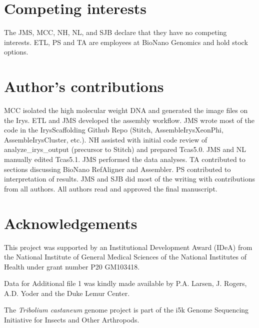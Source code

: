 \documentclass{bmcart}
\begin{document}
\begin{backmatter}

\section*{Competing interests}
  The JMS, MCC, NH, NL, and SJB declare that they have no competing interests. ETL, PS and TA are employees at BioNano Genomics and hold stock options. 


\section*{Author's contributions}
MCC isolated the high molecular weight DNA and generated the image files on the Irys. ETL and JMS developed the assembly workflow. JMS wrote most of the code in the IrysScaffolding Github Repo (Stitch, AssembleIrysXeonPhi, AssembleIrysCluster, etc.). NH assisted with initial code review of analyze\_irys\_output (precursor to Stitch) and prepared Tcas5.0. JMS and NL manually edited Tcas5.1. JMS performed the data analyses. TA contributed to sections discussing BioNano RefAligner and Assembler. PS contributed to interpretation of results. JMS and SJB did most of the writing with contributions from all authors. All authors read and approved the final manuscript.

\section*{Acknowledgements}
  This project was supported by an Institutional Development Award (IDeA) from the National Institute of General Medical Sciences of the National Institutes of Health under grant number P20 GM103418. 

Data for Additional file 1 was kindly made available by P.A. Larsen, J. Rogers, A.D. Yoder and the Duke Lemur Center.

The \textit{Tribolium castaneum} genome project is part of the i5k Genome Sequencing Initiative for Insects and Other Arthropods.



\end{backmatter}
\end{document}
